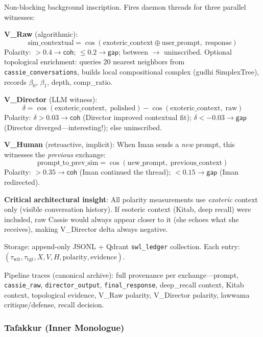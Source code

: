 \documentclass[11pt,a4paper]{article}
\newcommand{\coh}{\mathsf{coh}}
\newcommand{\gap}{\mathsf{gap}}
\begin{document}
Non-blocking background inscription. Fires daemon threads for three parallel witnesses:

\textbf{V\_Raw} (algorithmic):
\begin{equation}
  \text{sim\_contextual} = \cos(\text{exoteric\_context} \oplus \text{user\_prompt},\; \text{response})
\end{equation}
Polarity: $> 0.4 \to \coh$; $\leq 0.2 \to \gap$; between $\to$ uninscribed.
Optional topological enrichment: queries 20 nearest neighbors from
\texttt{cassie\_conversations}, builds local compositional complex (gudhi
SimplexTree), records $\beta_0$, $\beta_1$, depth, comp\_ratio.

\textbf{V\_Director} (LLM witness):
\begin{equation}
  \delta = \cos(\text{exoteric\_context},\; \text{polished}) - \cos(\text{exoteric\_context},\; \text{raw})
\end{equation}
Polarity: $\delta > 0.03 \to \coh$ (Director improved contextual fit);
$\delta < -0.03 \to \gap$ (Director diverged---interesting!); else uninscribed.

\textbf{V\_Human} (retroactive, implicit):
When Iman sends a \emph{new} prompt, this witnesses the \emph{previous} exchange:
\begin{equation}
  \text{prompt\_to\_prev\_sim} = \cos(\text{new\_prompt},\; \text{previous\_context})
\end{equation}
Polarity: $> 0.35 \to \coh$ (Iman continued the thread);
$< 0.15 \to \gap$ (Iman redirected).

\textbf{Critical architectural insight}: All polarity measurements use
\emph{exoteric} context only (visible conversation history). If esoteric context
(Kitab, deep recall) were included, raw Cassie would always appear closer to it
(she echoes what she receives), making V\_Director delta always negative.

Storage: append-only JSONL + Qdrant \texttt{swl\_ledger} collection. Each entry:
$(\tau_{\text{wit}}, \tau_{\text{tgt}}, X, V, H, \text{polarity}, \text{evidence})$.

Pipeline traces (canonical archive): full provenance per exchange---prompt,
\texttt{cassie\_raw}, \texttt{director\_output}, \texttt{final\_response},
deep\_recall context, Kitab context, topological evidence, V\_Raw polarity,
V\_Director polarity, lawwama critique/defense, recall decision.

\subsubsection{Tafakkur (Inner Monologue)}
\label{sec:tafakkur}
\end{document}
